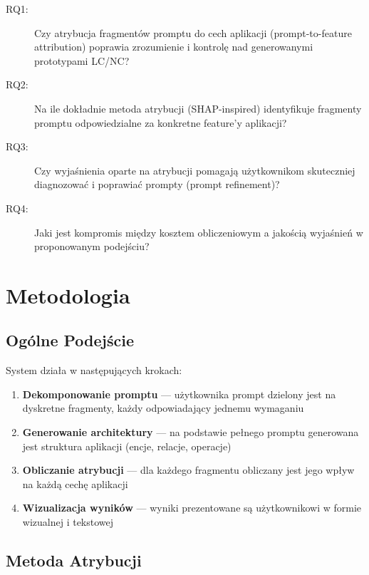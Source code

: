 \documentclass[12pt,a4paper]{article}
\begin{document}
\begin{description}
    \item[RQ1:] Czy atrybucja fragmentów promptu do cech aplikacji (prompt-to-feature attribution) poprawia zrozumienie i kontrolę nad generowanymi prototypami LC/NC?
    
    \item[RQ2:] Na ile dokładnie metoda atrybucji (SHAP-inspired) identyfikuje fragmenty promptu odpowiedzialne za konkretne feature'y aplikacji?
    
    \item[RQ3:] Czy wyjaśnienia oparte na atrybucji pomagają użytkownikom skuteczniej diagnozować i poprawiać prompty (prompt refinement)?
    
    \item[RQ4:] Jaki jest kompromis między kosztem obliczeniowym a jakością wyjaśnień w proponowanym podejściu?
\end{description}


\section{Metodologia}

\subsection{Ogólne Podejście}

System działa w następujących krokach:

\begin{enumerate}
    \item \textbf{Dekomponowanie promptu} --- użytkownika prompt dzielony jest na dyskretne fragmenty, każdy odpowiadający jednemu wymaganiu
    \item \textbf{Generowanie architektury} --- na podstawie pełnego promptu generowana jest struktura aplikacji (encje, relacje, operacje)
    \item \textbf{Obliczanie atrybucji} --- dla każdego fragmentu obliczany jest jego wpływ na każdą cechę aplikacji
    \item \textbf{Wizualizacja wyników} --- wyniki prezentowane są użytkownikowi w formie wizualnej i tekstowej
\end{enumerate}

\subsection{Metoda Atrybucji}
\end{document}
